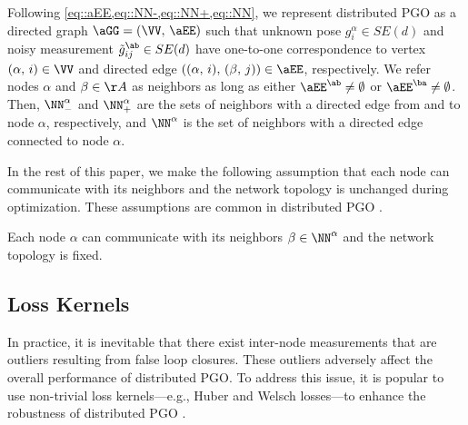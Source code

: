Following \cref{eq::aEE,eq::NN-,eq::NN+,eq::NN}, we represent distributed PGO as  a directed graph  $\aGG=(\VV,\,\aEE)$ such that  unknown pose $g_i^\alpha\in SE(d)$ and noisy measurement $\tilde{g}_{ij}^{\ab}\in SE(d)$ have one-to-one correspondence to vertex $(\alpha,\,i)\in\VV$   and  directed edge $((\alpha,\,i),\,(\beta,\,j))\in \aEE$, respectively.  We refer nodes $\alpha$ and $\beta\in\AA$ as neighbors as long as either $\aEE^{\ab}\neq\emptyset$ or $\aEE^{\ba}\neq\emptyset$. Then,  $\NN_-^\alpha$ and $\NN_+^\alpha$ are the sets of neighbors with a directed edge from and to node $\alpha$, respectively, and $\NN^\alpha$ is the set of neighbors with a directed edge connected to node $\alpha$.

In the rest of this paper, we make the following assumption that each node can communicate with its neighbors and the network topology is unchanged during optimization. These assumptions  are common in distributed PGO \cite{choudhary2017distributed,tian2019distributed,tron2014distributed,eric2020geod}.
\begin{assumption}\label{assumption::neighbor}
	Each node $\alpha$ can communicate with its neighbors $\beta\in\NN^\alpha$ and the network topology is fixed.
\end{assumption}
\vspace{-1.25em}

\subsection{Loss Kernels}
In practice, it is inevitable that there exist inter-node measurements that are outliers resulting from false loop closures. These outliers adversely affect the overall  performance of distributed PGO. To address this issue, it is popular to use non-trivial loss kernels---e.g., Huber and Welsch losses---to enhance the robustness of distributed PGO \cite{agarwal2013robust,carlone2018convex,barron2019cvpr}.

